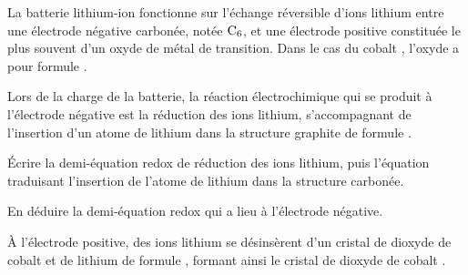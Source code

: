 La batterie lithium-ion fonctionne sur l'échange réversible d'ions lithium entre une électrode négative carbonée, notée $\ce{C_6}$, et une électrode positive constituée le plus souvent d'un oxyde de métal de transition. Dans le cas du cobalt , l'oxyde a pour formule .

Lors de la charge de la batterie, la réaction électrochimique qui se produit à l'électrode négative est la réduction des ions lithium, s'accompagnant de l'insertion d'un atome de lithium dans la structure graphite de formule .

\Q Écrire la demi-équation redox de réduction des ions lithium, puis l'équation traduisant l'insertion de l'atome de lithium dans la structure carbonée.


\Q En déduire la demi-équation redox qui a lieu à l'électrode négative.




À l'électrode positive, des ions lithium se désinsèrent d'un cristal de dioxyde de cobalt et de lithium de formule , formant ainsi le cristal de dioxyde de cobalt .

